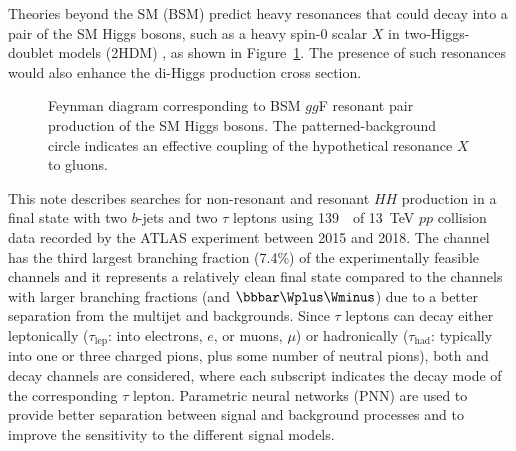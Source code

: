 Theories beyond the SM (BSM) predict heavy resonances that could decay into a pair of the SM Higgs bosons, such as a heavy spin-0 scalar $X$ in two-Higgs-doublet models (2HDM) \cite{Branco:2011iw,}, as shown in Figure~\ref{fig:ResonantggFPairProduction}. The presence of such resonances would also enhance the di-Higgs production cross section.  %

\begin{figure}[!h]
\centering
{}
\caption{Feynman diagram corresponding to BSM $gg$F resonant pair production of the SM Higgs bosons. The patterned-background circle indicates an effective coupling of the hypothetical resonance $X$ to gluons.}
\label{fig:ResonantggFPairProduction}
\end{figure}

This note describes searches for non-resonant and resonant $HH$ production in a final state with two $b$-jets and two $\tau$ leptons using 139~\ifb\ of 
13~TeV $pp$ collision data recorded by the ATLAS experiment between 2015 and 2018. The \bbtt channel has the third largest branching fraction (7.4\%) of the experimentally feasible channels and it represents a relatively clean final state compared to the channels with larger branching fractions (\bbbb and $\bbbar\Wplus\Wminus$) due to a better separation from the multijet and \ttbar backgrounds. Since $\tau$ leptons can decay either leptonically ($\tau_{\mathrm{lep}}$: into electrons, $e$, or muons, $\mu$) or hadronically ($\tau_{\mathrm{had}}$: typically into one or three charged pions, plus some number of neutral pions), both \lephad and \hadhad decay channels are considered, where each subscript indicates the decay mode of the corresponding $\tau$ lepton. Parametric neural networks (PNN) are used to provide better separation between signal and background processes and to improve the sensitivity to the different signal models.

